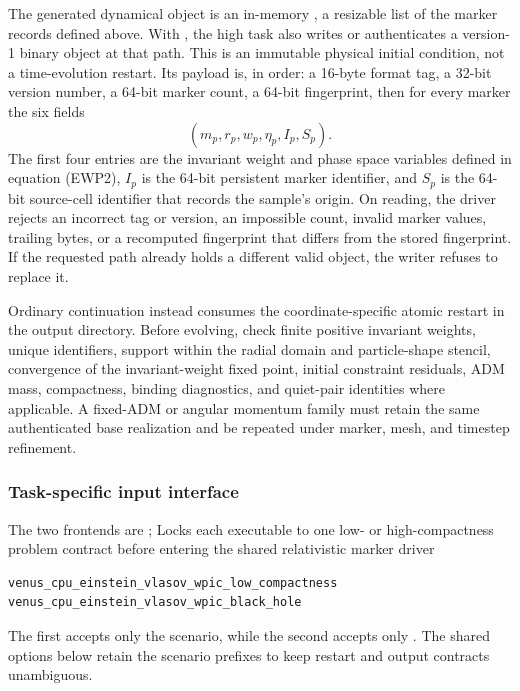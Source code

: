 The generated dynamical object is an in-memory
, a resizable list of the marker records
defined above.  With , the high task also writes or
authenticates a version-1  binary object at that path.
This is an immutable physical initial condition, not a time-evolution
restart.  Its payload is, in order: a 16-byte format tag, a 32-bit version
number, a 64-bit marker count, a 64-bit fingerprint, then for every marker the
six fields
\[
 (m_p,r_p,w_p,\eta_p,I_p,S_p).
\]
The first four entries are the invariant weight and phase space variables
defined in equation (EWP2), \(I_p\) is the 64-bit persistent marker identifier,
and \(S_p\) is the 64-bit source-cell identifier that records the sample's
origin.  On reading, the driver rejects an incorrect tag or version, an
impossible count, invalid marker values, trailing bytes, or a recomputed
fingerprint that differs from the stored fingerprint.  If the requested path
already holds a different valid object, the writer refuses to replace it.

Ordinary continuation instead consumes the coordinate-specific atomic restart
in the output directory.  Before evolving, check finite positive invariant
weights, unique identifiers, support within the radial domain and
particle-shape stencil, convergence of the invariant-weight fixed point,
initial constraint residuals, ADM mass, compactness, binding diagnostics, and
quiet-pair identities where applicable.  A fixed-ADM or angular momentum
family must retain the same authenticated base realization and be repeated
under marker, mesh, and timestep refinement.

\subsubsection{Task-specific input interface}

The two frontends are
{;
 }
{Locks each executable to one low- or high-compactness problem contract before
 entering the shared relativistic marker driver}
\begin{lstlisting}[basicstyle=\ttfamily\scriptsize]
venus_cpu_einstein_vlasov_wpic_low_compactness
venus_cpu_einstein_vlasov_wpic_black_hole
\end{lstlisting}
The first accepts only the  scenario, while the second accepts only
.
The shared options below retain the scenario prefixes to keep restart and
output contracts unambiguous.

